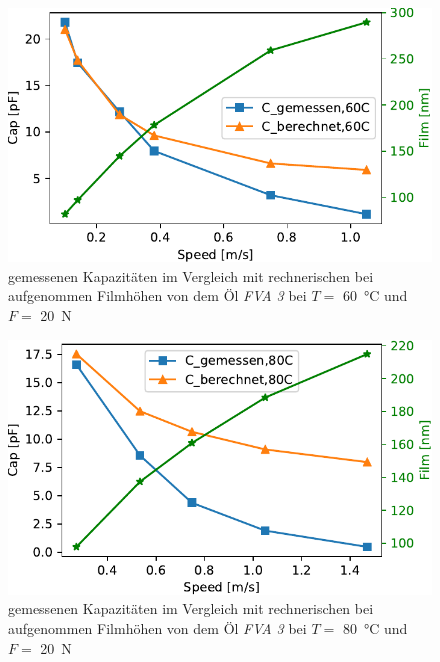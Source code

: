 \begin{figure}[htb]
    \centering
    \includegraphics[]{./images/cap_theo_meas_vs_speed_60C.pdf}
    \caption{gemessenen Kapazitäten im Vergleich mit rechnerischen bei aufgenommen Filmhöhen von dem Öl \textit{FVA 3} bei $T =$ \SI{60}{\degreeCelsius} und $F =$ \SI{20}{\N}}
    \label{fig:cap_meas_cap_theo_60C}
\end{figure}

\begin{figure}[htb]
    \centering
    \includegraphics[]{./images/cap_theo_meas_vs_speed_80C.pdf}
    \caption{gemessenen Kapazitäten im Vergleich mit rechnerischen bei aufgenommen Filmhöhen von dem Öl \textit{FVA 3} bei $T =$ \SI{80}{\degreeCelsius} und $F =$ \SI{20}{\N}}
    \label{fig:cap_meas_cap_theo_80C}
\end{figure}
